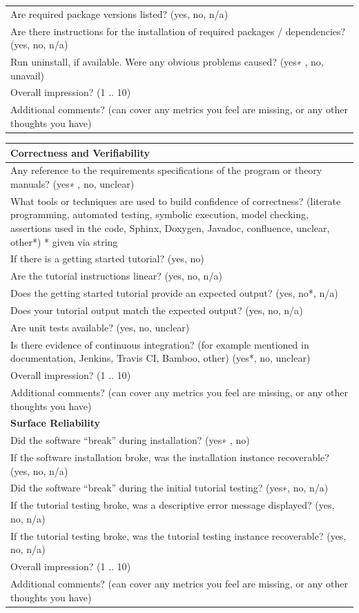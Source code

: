 \documentclass[12pt, notitlepage]{article}
\begin{document}
\begin{appendices}
\begin{singlespace}
\begin{tabular}{p{14cm}}
	Are required package versions listed? ({yes, no, n/a})\\
	Are there instructions for the installation of required packages / dependencies? ({yes, no, n/a})\\
	Run uninstall, if available. Were any obvious problems caused? ({yes∗ , no, unavail})\\
	Overall impression? ({1 .. 10})\\
	Additional comments? (can cover any metrics you feel are missing, or any other thoughts you have)\\
	\hline
\end{tabular}

\def\arraystretch{1.33}
\begin{tabular}{p{14cm}}
	\hline		
	\textbf{Correctness and Verifiability}\\
	\hline
	Any reference to the requirements specifications of the program or theory manuals? ({yes∗ , no, unclear})\\
	What tools or techniques are used to build confidence of correctness? ({literate programming, automated testing, symbolic execution, model checking, assertions used in the code, Sphinx, Doxygen, Javadoc, confluence, unclear, other*}) * given via string\\
	If there is a getting started tutorial? ({yes, no})\\
	Are the tutorial instructions linear? ({yes, no, n/a})\\
	Does the getting started tutorial provide an expected output? ({yes, no*, n/a})\\
	Does your tutorial output match the expected output? ({yes, no, n/a})\\
	Are unit tests available?  ({yes, no, unclear})\\
	Is there evidence of continuous integration? (for example mentioned in documentation, Jenkins, Travis CI, Bamboo, other) ({yes*, no, unclear})\\
	Overall impression? ({1 .. 10})\\
	Additional comments? (can cover any metrics you feel are missing, or any other thoughts you have) \\
	\hline	
	\textbf{Surface Reliability}\\
	\hline
	Did the software “break” during installation? ({yes∗ , no})\\
	If the software installation broke, was the installation instance recoverable? ({yes, no, n/a})\\
	Did the software “break” during the initial tutorial testing? ({yes∗, no, n/a})\\
	If the tutorial testing broke, was a descriptive error message displayed? ({yes, no, n/a})\\
	If the tutorial testing broke, was the tutorial testing instance recoverable? ({yes, no, n/a})\\
	Overall impression? ({1 .. 10})\\
	Additional comments? (can cover any metrics you feel are missing, or any other thoughts you have)\\
	\hline		
\end{tabular}


\end{singlespace}
\end{appendices}
\end{document}
